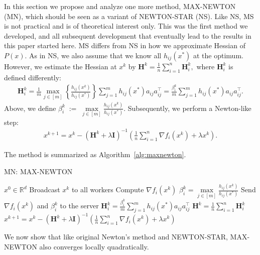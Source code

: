 \documentclass[10pt]{article}
\newcommand{\eqdef}{\; { := }\;}
\newcommand{\R}{\mathbb{R}}
\newcommand{\newalpha}{h}
\newcommand{\mH}{\mathbf{H}}
\newcommand{\mI}{\mathbf{I}}
\begin{document}
In this section we propose and analyze one more method, {\sf MAX-NEWTON (MN)}, which should be seen as a variant of  {\sf NEWTON-STAR (NS)}. Like {\sf NS}, {\sf MS} is not practical and is of theoretical interest only. This was the first method we developed, and all subsequent development that eventually lead to the results in this paper started here.
{\sf MS} differs from {\sf NS} in how we approximate Hessian of $P(x)$. As in {\sf NS}, we also assume that we know all $\newalpha_{ij}(x^*)$ at the optimum. However,  we estimate the Hessian at $x^k$ by $\mH^k = \frac{1}{n}\sum\limits_{i=1}^n\mH_i^k,$ where $\mH_i^k$ is defined differently:
\begin{eqnarray*}
	\mH_i^k = \frac{1}{m}\max_{j \in [m]}\left\{\frac{\newalpha_{ij}(x^k)}{\newalpha_{ij}(x^*)}\right\}\sum\limits_{j=1}^m\newalpha_{ij}(x^*)a_{ij}a_{ij}^\top = \frac{\beta^k_i}{m}\sum\limits_{j=1}^m\newalpha_{ij}(x^*)a_{ij}a_{ij}^\top.
\end{eqnarray*}
Above, we define $\beta_i^k \eqdef \max\limits_{j \in [m]}\frac{\newalpha_{ij}(x^k)}{\newalpha_{ij}(x^*)}$. Subsequently, we perform a Newton-like  step:
\begin{eqnarray*}
	x^{k+1} = x^k - \left(\mH^k + \lambda \mI \right)^{-1}\left(\frac{1}{n}\sum\limits_{i=1}^n \nabla f_i(x^k) +\lambda x^k\right).
\end{eqnarray*}

The method is summarized as Algorithm~\ref{alg:maxnewton}.

\begin{algorithm}[h]
	\caption{{\sf MN: MAX-NEWTON}}
	\label{alg:maxnewton}
	\begin{algorithmic}
		$x^0 \in \R^d$
		\STATE Broadcast $x^k$ to all workers 
		\STATE Compute $\nabla f_i(x^k)$ 
		\STATE $\beta_i^k = \max\limits_{j \in [m]}\frac{\newalpha_{ij}(x^k)}{\newalpha_{ij}(x^*)}$ 
		\STATE Send $\nabla f_i(x^k)$ and $\beta_i^k$ to the server 
		\ENDFOR
		\STATE $\mH_i^k = \frac{\beta_i^k}{m}\sum\limits_{j=1}^m\newalpha_{ij}(x^*)a_{ij}a_{ij}^\top$
		\STATE $\mH^k = \frac{1}{n}\sum\limits_{i=1}^n \mH_i^k$
		\STATE $x^{k+1} = x^k - \left(\mH^k + \lambda \mI \right)^{-1}\left(\frac{1}{n}\sum\limits_{i=1}^n \nabla f_i(x^k)+ \lambda x^k\right)$
		\ENDFOR
	\end{algorithmic}
\end{algorithm} 

We now show that like original Newton's method and {\sf NEWTON-STAR}, {\sf MAX-NEWTON} also converges locally quadratically.
\end{document}
